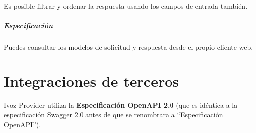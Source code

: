 \documentclass[letterpaper,10pt,spanish]{sphinxmanual}
\begin{document}

Es posible filtrar y ordenar la respuesta usando los campos de entrada  también.
\paragraph{Especificación}

Puedes consultar los modelos de solicitud y respuesta desde el propio cliente web.



\chapter{Integraciones de terceros}
\label{api_rest/integrations:third-party-integrations}\label{api_rest/integrations::doc}
Ivoz Provider utiliza la \textbf{Especificación OpenAPI 2.0} (que es idéntica a la especificación Swagger 2.0 antes de que se renombrara a ``Especificación OpenAPI'').
\end{document}

